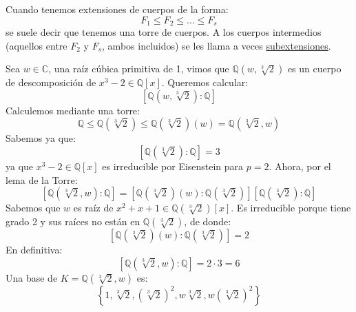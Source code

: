 \begin{notacion}
    Cuando tenemos extensiones de cuerpos de la forma:
    \begin{equation*}
        F_1 \leq F_2 \leq \ldots \leq F_s
    \end{equation*}
    se suele decir que tenemos una torre de cuerpos. A los cuerpos intermedios (aquellos entre $F_2$ y $F_s$, ambos incluidos) se les llama a veces \underline{subextensiones}.
\end{notacion}

\begin{ejemplo}
    Sea $w\in \mathbb{C}$, una raíz cúbica primitiva de 1, vimos que $\mathbb{Q}(w,\sqrt[3]{2})$ es un cuerpo de descomposición de $x^3-2\in \mathbb{Q}[x]$. Queremos calcular:
    \begin{equation*}
        \left[\mathbb{Q}\left(w, \sqrt[3]{2}\right):\mathbb{Q}\right]
    \end{equation*}
    Calculemos mediante una torre:
    \begin{equation*}
        \mathbb{Q} \leq \mathbb{Q}\left(\sqrt[3]{2}\right) \leq \mathbb{Q}\left(\sqrt[3]{2}\right)(w) = \mathbb{Q}\left(\sqrt[3]{2}, w\right)
    \end{equation*}
    Sabemos ya que:
    \begin{equation*}
        \left[\mathbb{Q}\left(\sqrt[3]{2}\right):\mathbb{Q}\right] = 3
    \end{equation*}
    ya que $x^3-2\in \mathbb{Q}[x]$  es irreducible por Eisenstein para $p=2$. Ahora, por el lema de la Torre:
    \begin{equation*}
        \left[\mathbb{Q}\left(\sqrt[3]{2},w\right):\mathbb{Q}\right] = \left[\mathbb{Q}\left(\sqrt[3]{2}\right)(w) : \mathbb{Q}\left(\sqrt[3]{2}\right)\right]\left[\mathbb{Q}\left(\sqrt[3]{2}\right):\mathbb{Q}\right]
    \end{equation*}
    Sabemos que $w$ es raíz de $x^2+x+1\in \mathbb{Q}\left(\sqrt[3]{2}\right)[x]$. Es irreducible porque tiene grado 2 y sus raíces no están en $\mathbb{Q}\left(\sqrt[3]{2}\right)$, de donde:
    \begin{equation*}
        \left[\mathbb{Q}\left(\sqrt[3]{2}\right)(w) : \mathbb{Q}\left(\sqrt[3]{2}\right)\right] = 2
    \end{equation*}
    En definitiva:
    \begin{equation*}
        \left[\mathbb{Q}\left(\sqrt[3]{2},w\right):\mathbb{Q}\right] = 2\cdot 3 = 6
    \end{equation*}
    Una base de $K=\mathbb{Q}\left(\sqrt[3]{2},w\right)$ es:
    \begin{equation*}
        \left\{1, \sqrt[3]{2}, {\left(\sqrt[3]{2}\right)}^{2}, w\sqrt[3]{2}, w{\left(\sqrt[3]{2}\right)}^{2}\right\}
    \end{equation*}
\end{ejemplo}

